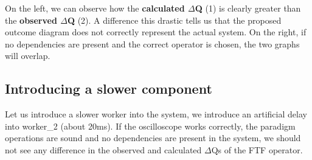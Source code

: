     On the left, we can observe how the \textbf{calculated $\Delta$Q} (1) is clearly greater than the \textbf{observed $\Delta$Q} (2). A difference this drastic tells us that the proposed outcome diagram does not correctly represent the actual system. On the right, if no dependencies are present and the correct operator is chosen, the two graphs will overlap.

    \subsection{Introducing a slower component}
        Let us introduce a slower worker into the system, we introduce an artificial delay into worker\_2 (about 20ms). If the oscilloscope works correctly, the paradigm operations are sound and no dependencies are present in the system, we should not see any difference in the observed and calculated $\Delta$Qs of the FTF operator.

